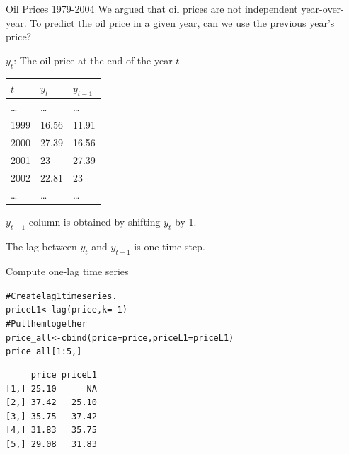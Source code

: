 \documentclass{beamer}\usepackage[]{graphicx}\usepackage[]{color}
\makeatletter
\newcommand{\hlnum}[1]{\textcolor[rgb]{0.824,0.412,0.118}{#1}}%
\newcommand{\hlcom}[1]{\textcolor[rgb]{0.824,0.706,0.549}{#1}}%
\newcommand{\hlopt}[1]{\textcolor[rgb]{1,0.894,0.769}{#1}}%
\newcommand{\hlstd}[1]{\textcolor[rgb]{1,0.894,0.769}{#1}}%
\newcommand{\hlkwb}[1]{\textcolor[rgb]{0.804,0.776,0.451}{#1}}%
\newcommand{\hlkwc}[1]{\textcolor[rgb]{0.78,0.941,0.545}{#1}}%
\newcommand{\hlkwd}[1]{\textcolor[rgb]{1,0.78,0.769}{#1}}%
\newenvironment{kframe}{%
 \def\at@end@of@kframe{}%
 \ifinner\ifhmode%
  \def\at@end@of@kframe{\end{minipage}}%
  \begin{minipage}{\columnwidth}%
 \fi\fi%
 \def\FrameCommand##1{\hskip\@totalleftmargin \hskip-\fboxsep
 \colorbox{shadecolor}{##1}\hskip-\fboxsep
     \hskip-\linewidth \hskip-\@totalleftmargin \hskip\columnwidth}%
 \MakeFramed {\advance\hsize-\width
   \@totalleftmargin\z@ \linewidth\hsize
   \@setminipage}}%
 {\par\unskip\endMakeFramed%
 \at@end@of@kframe}
\newenvironment{knitrout}{}{} %
\makeatother
\begin{document}
\begin{darkframes}
\begin{frame}[fragile]{Oil Prices 1979-2004}
      We argued that oil prices are not independent year-over-year. \pause To predict the oil price in a given year, can we use the previous year's price? \pause

      \begin{center}
        $y_t$: The oil price at the end of the year $t$ \pause\bigskip

        \begin{tabular}{lll}
          \hline
            $t$ & $y_t$ &  $y_{t-1}$\\
          \hline
          \ldots & \ldots & \ldots \\
          1999	& 16.56 & 11.91 \\
          2000 &	27.39 & 16.56  \\
          2001	& 23 & 27.39 \\
          2002	& 22.81 & 23 \\
          \ldots & \ldots & \ldots \\
          \hline
        \end{tabular}
      \end{center}
      \pause

      $y_{t-1}$ column is obtained by shifting $y_t$ by 1. \pause

      The \alert{lag} between $y_t$ and $y_{t-1}$ is one time-step.

\end{frame}


\begin{frame}[fragile]{Compute one-lag time series}
      \fontsize{10}{10}\selectfont
\begin{knitrout}
\begin{kframe}
\begin{alltt}
\hlcom{# Create lag 1 time series.}
\hlstd{priceL1} \hlkwb{<-} \hlkwd{lag}\hlstd{(price,} \hlkwc{k}\hlstd{=}\hlopt{-}\hlnum{1}\hlstd{)}
\hlcom{# Put them together}
\hlstd{price_all} \hlkwb{<-} \hlkwd{cbind}\hlstd{(}\hlkwc{price}\hlstd{=price,} \hlkwc{priceL1}\hlstd{=priceL1)}
\hlstd{price_all[}\hlnum{1}\hlopt{:}\hlnum{5}\hlstd{,]}
\end{alltt}
\begin{verbatim}
     price priceL1
[1,] 25.10      NA
[2,] 37.42   25.10
[3,] 35.75   37.42
[4,] 31.83   35.75
[5,] 29.08   31.83
\end{verbatim}
\end{kframe}
\end{knitrout}
      \pause


\end{frame}
\end{darkframes}
\end{document}
